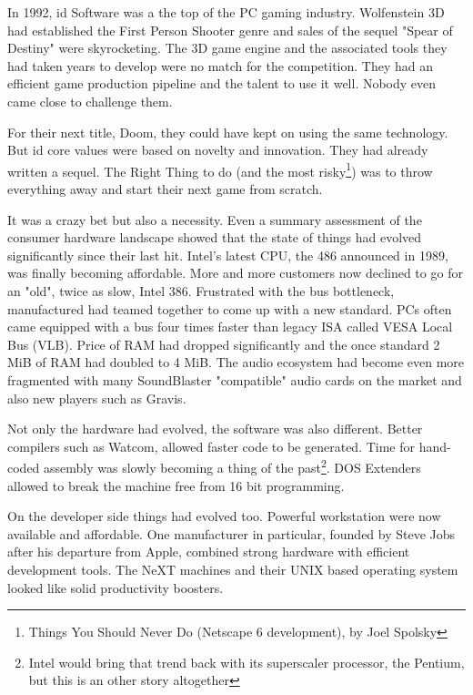 In 1992, id Software was a the top of the PC gaming industry. Wolfenstein 3D had established the First
Person Shooter genre and sales of the sequel "Spear of Destiny" were skyrocketing. The 3D game engine and the associated 
tools they had taken years to develop were no match for the competition. They had an efficient game production pipeline and the talent to use it well. Nobody even came close to challenge them.\\
\par
For their next title, Doom, they could have kept on using the same technology. But id core values were based on novelty and innovation. They had already written a sequel. The Right Thing to do (and the most risky\footnote{Things You Should Never Do (Netscape 6 development), by Joel Spolsky}) was to throw everything away and start their next game from scratch.\\
\par
It was a crazy bet but also a necessity. Even a summary assessment of the consumer hardware landscape showed that the state of things had evolved significantly since their last hit. Intel's latest CPU, the 486 announced in 1989, was finally becoming affordable. More and more customers now declined to go for an "old", twice as slow, Intel 386. Frustrated with the bus bottleneck, manufactured had teamed together to come up with a new standard. PCs often came equipped with a bus four times faster than legacy ISA called VESA Local Bus (VLB). Price of RAM had dropped significantly and the once standard 2 MiB of RAM had doubled to 4 MiB. The audio ecosystem had become even more fragmented with many SoundBlaster "compatible" audio cards on the market and also new players such as Gravis.\\
 \par 
 Not only the hardware had evolved, the software was also different. Better compilers such as Watcom, allowed faster code to be generated. Time for hand-coded assembly was slowly becoming a thing of the past\footnote{Intel would bring that trend back with its superscaler processor, the Pentium, but this is an other story altogether}. DOS Extenders allowed to break the machine free from 16 bit programming.\\
 \par
 On the developer side things had evolved too. Powerful workstation were now available and affordable. One manufacturer in particular, founded by Steve Jobs after his departure from Apple, combined strong hardware with efficient development tools. The NeXT machines and their UNIX based operating system looked like solid productivity boosters.\\
